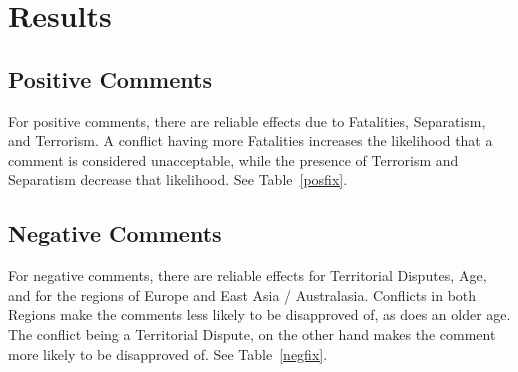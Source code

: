 \section{Results}
\subsection{Positive Comments}
For positive comments, there are reliable effects due to Fatalities, Separatism, and Terrorism. A conflict having more Fatalities increases the likelihood that a comment is considered unacceptable, while the presence of Terrorism and Separatism decrease that likelihood. See Table~\ref{posfix}.

\subsection{Negative Comments}
For negative comments, there are reliable effects for Territorial Disputes, Age, and for the regions of Europe and East Asia / Australasia. Conflicts in both Regions make the comments less likely to be disapproved of, as does an older age. The conflict being a Territorial Dispute, on the other hand makes the comment more likely to be disapproved of. See Table~\ref{negfix}.

